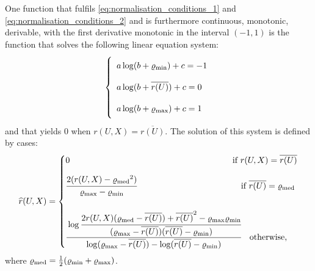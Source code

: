 One function that fulfils \eqref{eq:normalisation_conditions_1} and \eqref{eq:normalisation_conditions_2} and is furthermore continuous, monotonic, derivable, with the first derivative monotonic in the interval $(-1,1)$ is the function that solves the following linear equation system:
\begin{equation*}%
\left\{ \begin{array}{ll}
\rule[-1em]{0pt}{2.5em}
a\log(b + \varrho_{\min}) + c = -1\\
\rule[-1em]{0pt}{2.5em}
a\log(b + \overline{r(U)}) + c = 0\\
\rule[-1em]{0pt}{2.5em}
a\log(b + \varrho_{\max}) + c = 1
\end{array} \right.
\end{equation*}
and that yields $0$ when $r(U,X) = \overline{r(U)}$.
The solution of this system is defined by cases:
\begin{equation*}
\widehat{r}(U,X) = 
\begin{cases}
\rule[-1em]{0pt}{2em} 
0 
&\hspace{-2em}\text{if $r(U,X) = \overline{r(U)}$}\\   
\rule[-1em]{0pt}{3em} 
\cfrac{2(r(U,X) - {\varrho_{\med}}^2)}{\varrho_{\max} -\varrho_{\min}} 
&\hspace{-1em}\text{if $\overline{r(U)} = \varrho_{\med}$}\\
\rule[-1em]{0pt}{6em} 
\cfrac{\log\cfrac{2r(U,X)(\varrho_{\med} - \overline{r(U)}) + \overline{r(U)}^2 - \varrho_{\max}\varrho_{\min}}{(\varrho_{\max} - \overline{r(U)})(\overline{r(U)} - \varrho_{\min})}}
 {\log(\varrho_{\max} - \overline{r(U)}) - \log(\overline{r(U)} -  \varrho_{\min})} 
& \text{otherwise,}
\end{cases}
\end{equation*}
where $\varrho_{\operatorname{med}} = \frac{1}{2}(\varrho_{\min} + \varrho_{\max})$. %
%


